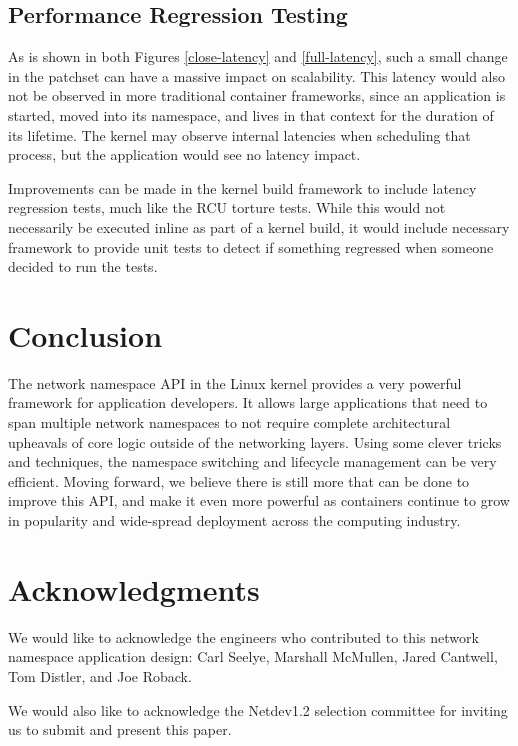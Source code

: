 \documentclass[letterpaper]{article}
\begin{document}
\subsection{Performance Regression Testing}
As is shown in both Figures \ref{close-latency} and \ref{full-latency}, such a small change in the patchset \cite{biederman2014} can have a massive impact on scalability. This latency would also not be observed in more traditional container frameworks, since an application is started, moved into its namespace, and lives in that context for the duration of its lifetime. The kernel may observe internal latencies when scheduling that process, but the application would see no latency impact.

Improvements can be made in the kernel build framework to include latency regression tests, much like the RCU torture tests. While this would not necessarily be executed inline as part of a kernel build, it would include necessary framework to provide unit tests to detect if something regressed when someone decided to run the tests.

\section{Conclusion}
The network namespace API in the Linux kernel provides a very powerful framework for application developers. It allows large applications that need to span multiple network namespaces to not require complete architectural upheavals of core logic outside of the networking layers. Using some clever tricks and techniques, the namespace switching and lifecycle management can be very efficient. Moving forward, we believe there is still more that can be done to improve this API, and make it even more powerful as containers continue to grow in popularity and wide-spread deployment across the computing industry.

\section{Acknowledgments}
We would like to acknowledge the engineers who contributed to this network namespace application design: Carl Seelye, Marshall McMullen, Jared Cantwell, Tom Distler, and Joe Roback.

We would also like to acknowledge the Netdev1.2 selection committee for inviting us to submit and present this paper.



\end{document}
